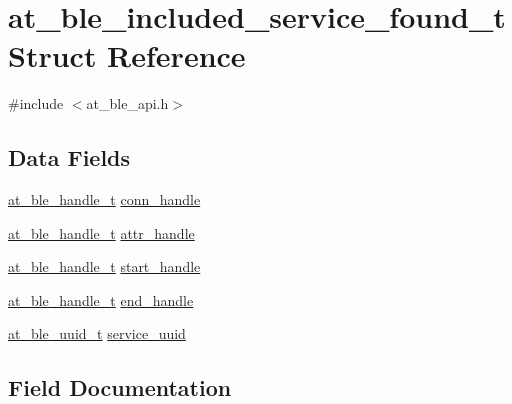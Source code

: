 \hypertarget{structat__ble__included__service__found__t}{}\section{at\+\_\+ble\+\_\+included\+\_\+service\+\_\+found\+\_\+t Struct Reference}
\label{structat__ble__included__service__found__t}


{\ttfamily \#include $<$at\+\_\+ble\+\_\+api.\+h$>$}

\subsection*{Data Fields}
\begin{DoxyCompactItemize}
\item 
\mbox{\hyperlink{at__ble__api_8h_abd23646d0c662860741f787efc8456f2}{at\+\_\+ble\+\_\+handle\+\_\+t}} \mbox{\hyperlink{structat__ble__included__service__found__t_ae42df6fd8493f8f8faeccfdd6062e96f}{conn\+\_\+handle}}
\item 
\mbox{\hyperlink{at__ble__api_8h_abd23646d0c662860741f787efc8456f2}{at\+\_\+ble\+\_\+handle\+\_\+t}} \mbox{\hyperlink{structat__ble__included__service__found__t_a26dee667ac1711fefe23b8279d1c36ae}{attr\+\_\+handle}}
\item 
\mbox{\hyperlink{at__ble__api_8h_abd23646d0c662860741f787efc8456f2}{at\+\_\+ble\+\_\+handle\+\_\+t}} \mbox{\hyperlink{structat__ble__included__service__found__t_ac7742bb811cf20fa3215e3d2129b6b26}{start\+\_\+handle}}
\item 
\mbox{\hyperlink{at__ble__api_8h_abd23646d0c662860741f787efc8456f2}{at\+\_\+ble\+\_\+handle\+\_\+t}} \mbox{\hyperlink{structat__ble__included__service__found__t_a6ba46ffbef9b8627bb3f869145e8d37a}{end\+\_\+handle}}
\item 
\mbox{\hyperlink{structat__ble__uuid__t}{at\+\_\+ble\+\_\+uuid\+\_\+t}} \mbox{\hyperlink{structat__ble__included__service__found__t_a87ec4f9ef72befe1558faedefc80b7d7}{service\+\_\+uuid}}
\end{DoxyCompactItemize}


\subsection{Field Documentation}
\mbox{\label{structat__ble__included__service__found__t_a26dee667ac1711fefe23b8279d1c36ae}} 

